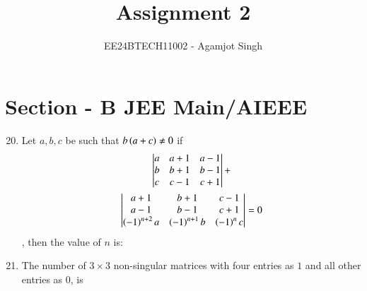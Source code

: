 \documentclass[journal,onecolumn]{IEEEtran}
\theoremstyle{remark}
\begin{document}

\vspace{3cm}

\title{Assignment 2}
\author{EE24BTECH11002 - Agamjot Singh}
\maketitle

\renewcommand{\thefigure}{\theenumi}
\renewcommand{\thetable}{\theenumi}
\section*{Section - B JEE Main/AIEEE}
\begin{enumerate}
    \setcounter{enumi}{19}

    \item Let $a,b,c$ be such that $b\left(a+c\right)\neq0$ if
	\begin{multline*}
		\begin{vmatrix}
			a & a+1 & a-1\\
			b & b+1 & b-1\\
			c & c-1 & c+1\\
		\end{vmatrix}
		+\\
		\begin{vmatrix}
			a+1 & b+1 & c-1\\
			a-1 & b-1 & c+1\\
			\left(-1\right)^{n+2}a & \left(-1\right)^{n+1}b & \left(-1\right)^{n}c\\
		\end{vmatrix}	
		= 0
	\end{multline*},
		then the value of $n$ is:
	\hfill{}
	\begin{enumerate}

	\end{enumerate}

    \item The number of $3\times3$ non-singular matrices with four entries as $1$ and all other entries as $0$, is 
	\hfill{}{\par}



\end{enumerate}
\end{document}
